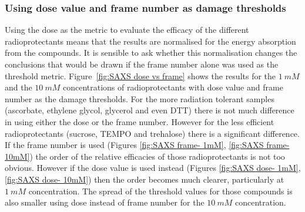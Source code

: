 \subsubsection{Using dose value and frame number as damage thresholds}
\label{subs:Using dose value and frame number as damage thresholds}
Using the dose as the metric to evaluate the efficacy of the different radioprotectants means that the results are normalised for the energy absorption from the compounds. It is sensible to ask whether this normalisation changes the conclusions that would be drawn if the frame number alone was used as the threshold metric.
Figure~\ref{fig:SAXS dose vs frame} shows the results for the $1\ mM$ and the $10\ mM$ concentrations of radioprotectants with dose value and frame number as the damage thresholds.
For the more radiation tolerant samples (ascorbate, ethylene glycol, glycerol and even DTT) there is not much difference in using either the dose or the frame number.
However for the less efficient radioprotectants (sucrose, TEMPO and trehalose) there is a significant difference.
If the frame number is used (Figures \ref{fig:SAXS frame- 1mM}, \ref{fig:SAXS frame- 10mM}) the order of the relative efficacies of those radioprotectants is not too obvious.
However if the dose value is used instead (Figures \ref{fig:SAXS dose- 1mM}, \ref{fig:SAXS dose- 10mM}) then the order becomes much clearer, particularly at $1\ mM$ concentration.
The spread of the threshold values for those compounds is also smaller using dose instead of frame number for the $10\ mM$ concentration.
